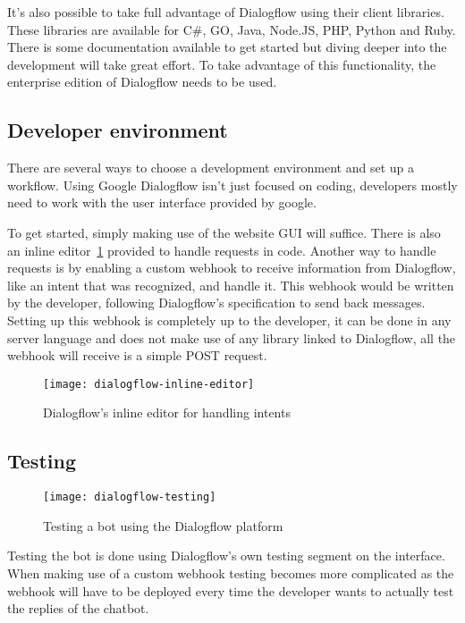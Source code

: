 It's also possible to take full advantage of Dialogflow using their client libraries. These libraries are available for C\#, GO, Java, Node.JS, PHP, Python and Ruby. There is some documentation available to get started but diving deeper into the development will take great effort. To take advantage of this functionality, the enterprise edition of Dialogflow needs to be used.

\subsection{Developer environment}

There are several ways to choose a development environment and set up a workflow. Using Google Dialogflow isn't just focused on coding, developers mostly need to work with the user interface provided by google.

To get started, simply making use of the website GUI will suffice. There is also an inline editor~\ref{fig:dialogflow-inline-editor} provided to handle requests in code. Another way to handle requests is by enabling a custom webhook to receive information from Dialogflow, like an intent that was recognized, and handle it. This webhook would be written by the developer, following Dialogflow's specification to send back messages. Setting up this webhook is completely up to the developer, it can be done in any server language and does not make use of any library linked to Dialogflow, all the webhook will receive is a simple POST request.

\begin{figure}[ht]
	\centering
	\texttt{[image: dialogflow-inline-editor]}\label{fig:dialogflow-inline-editor}
	\caption{Dialogflow's inline editor for handling intents}
\end{figure}

\subsection{Testing}

\begin{wrapfigure}{r}{0.35\textwidth}
	\texttt{[image: dialogflow-testing]}\label{fig:dialogflow-testing}
	\caption{Testing a bot using the Dialogflow platform}
\end{wrapfigure}

Testing the bot is done using Dialogflow's own testing segment on the interface. When making use of a custom webhook testing becomes more complicated as the webhook will have to be deployed every time the developer wants to actually test the replies of the chatbot.

